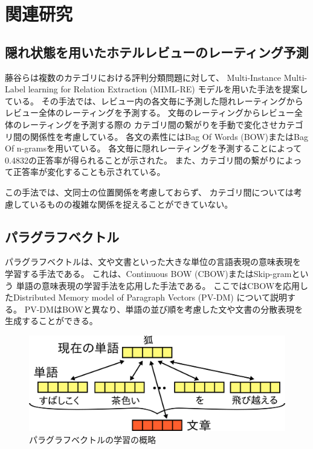 \section{関連研究}

\subsection{隠れ状態を用いたホテルレビューのレーティング予測}

藤谷ら\cite{fujitani15}は複数のカテゴリにおける評判分類問題に対して、
Multi-Instance Multi-Label learning for Relation Extraction (MIML-RE)
\cite{mihai12}モデルを用いた手法を提案している。
その手法では、レビュー内の各文毎に予測した隠れレーティングから
レビュー全体のレーティングを予測する。
文毎のレーティングからレビュー全体のレーティングを予測する際の
カテゴリ間の繋がりを手動で変化させカテゴリ間の関係性を考慮している。
各文の素性にはBag Of Words (BOW)またはBag Of n-gramsを用いている。
各文毎に隠れレーティングを予測することによって
0.4832の正答率が得られることが示された。
また、カテゴリ間の繋がりによって正答率が変化することも示されている。

この手法では、文同士の位置関係を考慮しておらず、
カテゴリ間については考慮しているものの複雑な関係を捉えることができていない。


\subsection{パラグラフベクトル}

パラグラフベクトルは、文や文書といった大きな単位の言語表現の意味表現を
学習する手法である。
これは、Continuous BOW (CBOW)またはSkip-gram\cite{yoshua03}という
単語の意味表現の学習手法を応用した手法である。
ここではCBOWを応用したDistributed Memory model of Paragraph Vectors (PV-DM)
について説明する。
PV-DMはBOWと異なり、単語の並び順を考慮した文や文書の分散表現を
生成することができる。

\begin{figure}[t!]
  \includegraphics{fig/paragraph_vector.png}
  \caption{パラグラフベクトルの学習の概略}
  \label{fig:ParagraphVector}
\end{figure}

